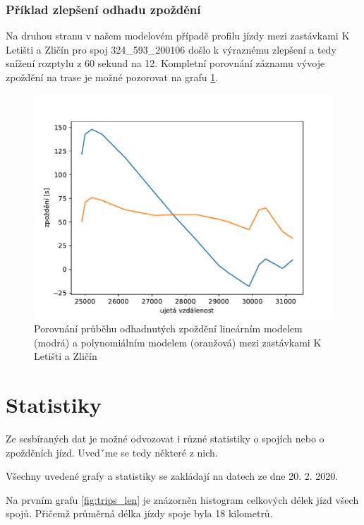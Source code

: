 \subsubsection{Příklad zlepšení odhadu zpoždění}

Na druhou stranu v našem modelovém případě profilu jízdy mezi zastávkami K Letišti a Zličín pro spoj 324\_593\_200106 došlo k výraznému zlepšení a tedy snížení rozptylu z 60 sekund na 12. Kompletní porovnání záznamu vývoje zpoždění na trase je možné pozorovat na grafu \ref{fig:compare_534_421}.

\begin{figure}
	\centering
  \includegraphics[width=1\linewidth]{../img/compare_534_421}
  \caption{Porovnání průběhu odhadnutých zpoždění lineárním modelem (modrá) a polynomiálním modelem (oranžová) mezi zastávkami K Letišti a Zličín}
  \label{fig:compare_534_421}
\end{figure}

\section{Statistiky}

Ze sesbíraných dat je možné odvozovat i různé statistiky o spojích nebo o zpožděních jízd. Uvedˇme se tedy některé z nich.

\bigbreak

Všechny uvedené grafy a statistiky se zakládají na datech ze dne 20. 2. 2020.

\bigbreak

Na prvním grafu \ref{fig:trips_len} je znázorněn histogram celkových délek jízd všech spojů. Přičemž průměrná délka jízdy spoje byla 18 kilometrů.

